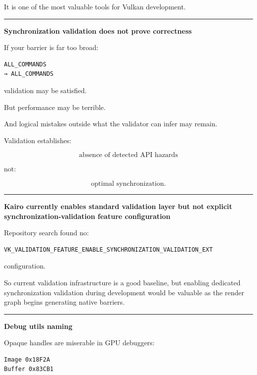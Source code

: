 It is one of the most valuable tools for Vulkan development.

\begin{center}\rule{0.5\linewidth}{0.5pt}\end{center}

\textbf{Synchronization validation does not prove correctness}

If your barrier is far too broad:

\begin{verbatim}
ALL_COMMANDS
→ ALL_COMMANDS
\end{verbatim}

validation may be satisfied.

But performance may be terrible.

And logical mistakes outside what the validator can infer may remain.

Validation establishes:

\[
\boxed{
\text{absence of detected API hazards}
}
\]

not:

\[
\text{optimal synchronization}.
\]

\begin{center}\rule{0.5\linewidth}{0.5pt}\end{center}

\textbf{Kairo currently enables standard validation layer but not explicit synchronization-validation feature configuration}

Repository search found no:

\begin{verbatim}
VK_VALIDATION_FEATURE_ENABLE_SYNCHRONIZATION_VALIDATION_EXT
\end{verbatim}

configuration.

So current validation infrastructure is a good baseline, but enabling dedicated synchronization validation during development would be valuable as the render graph begins generating native barriers.

\begin{center}\rule{0.5\linewidth}{0.5pt}\end{center}

\textbf{Debug utils naming}

Opaque handles are miserable in GPU debuggers:

\begin{verbatim}
Image 0x18F2A
Buffer 0x83CB1
\end{verbatim}

